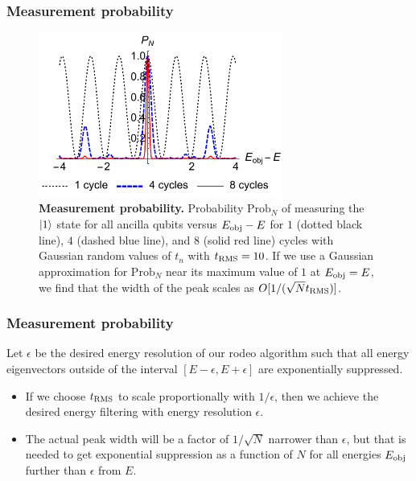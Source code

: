 \documentclass{beamer}
\begin{document}
\begin{frame}
\frametitle{Measurement probability}
\begin{figure}
\centering
\includegraphics[width=8.0cm]{rodeofigs/rodeo_probability.pdf}
\caption{{\bf Measurement probability.} Probability $\mathrm{Prob}_N$ of measuring the $\ket{1}$ state for all ancilla qubits versus $E_{\rm obj}-E$ for $1$ (dotted black line), $4$ (dashed blue line), and $8$ (solid red line) cycles with Gaussian random values of $t_n$ with $t_{\rm RMS}=10$. If we use a Gaussian approximation for $\mathrm{Prob}_N$ near its maximum value of $1$ at $E_{\rm obj}=E$, we find that the width of the peak scales as $O[1/(\sqrt{N}t_{\rm RMS})]$.}
\label{rodeo_probability}
\end{figure} 

\end{frame}


\begin{frame}
\frametitle{Measurement probability}

Let $\epsilon$ be the desired energy resolution of our rodeo algorithm such that all energy eigenvectors outside of the interval $[E-\epsilon, E+\epsilon]$ are exponentially suppressed.
\begin{itemize}
\item If we choose $t_{\rm RMS}$ to scale proportionally with $1/\epsilon$, then we achieve the desired energy filtering with energy resolution $\epsilon$.
\item The actual peak width will be a factor of $1/\sqrt{N}$ narrower than $\epsilon$, but that is needed to get exponential suppression as a function of $N$ for all energies $E_{\rm obj}$ further than $\epsilon$ from $E$. 
\end{itemize}
\end{frame}
\end{document}
